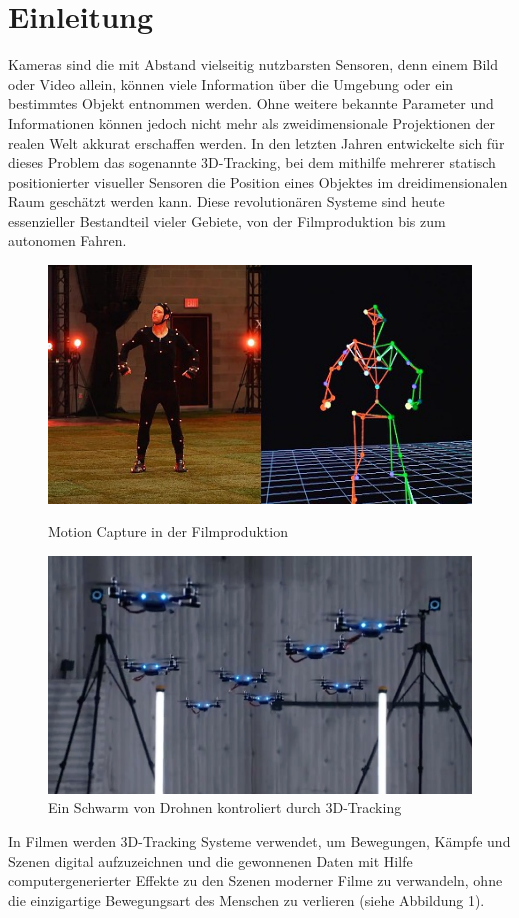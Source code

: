 \documentclass[12pt, ngerman]{article}
\begin{document}
\section{Einleitung}
Kameras sind die mit Abstand vielseitig nutzbarsten Sensoren, denn einem Bild oder Video allein, können viele Information über die Umgebung oder ein bestimmtes Objekt entnommen werden. Ohne weitere bekannte Parameter und Informationen können jedoch nicht mehr als zweidimensionale Projektionen der realen Welt akkurat erschaffen werden. In den letzten Jahren entwickelte sich für dieses Problem das sogenannte 3D-Tracking, bei dem mithilfe mehrerer statisch positionierter visueller Sensoren die Position eines Objektes im dreidimensionalen Raum geschätzt werden kann. Diese revolutionären Systeme sind heute essenzieller Bestandteil vieler Gebiete, von der Filmproduktion bis zum autonomen Fahren. \par
\begin{figure}
    \includegraphics[width=\linewidth]{motion_capture_fifa.jpg}
    \caption{Motion Capture in der Filmproduktion}
    \includegraphics[width=\linewidth]{drones.jpg}
    \caption{Ein Schwarm von Drohnen kontroliert durch 3D-Tracking}
\end{figure}
In Filmen werden 3D-Tracking Systeme verwendet, um Bewegungen, Kämpfe und Szenen digital aufzuzeichnen und die gewonnenen Daten mit Hilfe computergenerierter Effekte zu den Szenen moderner Filme zu verwandeln, ohne die einzigartige Bewegungsart des Menschen zu verlieren (siehe Abbildung 1). 
\end{document}
